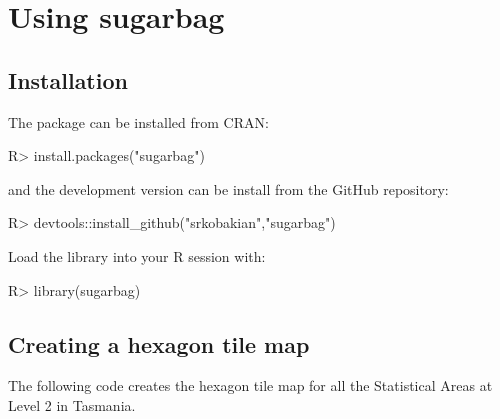 \documentclass[
]{jss}
\begin{document}
\hypertarget{using-sugarbag}{%
\section{Using sugarbag}\label{using-sugarbag}}

\hypertarget{installation}{%
\subsection{Installation}\label{installation}}

The package can be installed from CRAN:

\begin{CodeChunk}

\begin{CodeInput}
R> install.packages("sugarbag")
\end{CodeInput}
\end{CodeChunk}

and the development version can be install from the GitHub repository:

\begin{CodeChunk}

\begin{CodeInput}
R> devtools::install_github("srkobakian","sugarbag")
\end{CodeInput}
\end{CodeChunk}

Load the library into your R session with:

\begin{CodeChunk}

\begin{CodeInput}
R> library(sugarbag)
\end{CodeInput}
\end{CodeChunk}

\hypertarget{creating-a-hexagon-tile-map}{%
\subsection{Creating a hexagon tile
map}\label{creating-a-hexagon-tile-map}}

The following code creates the hexagon tile map for all the Statistical
Areas at Level 2 in Tasmania.
\end{document}
